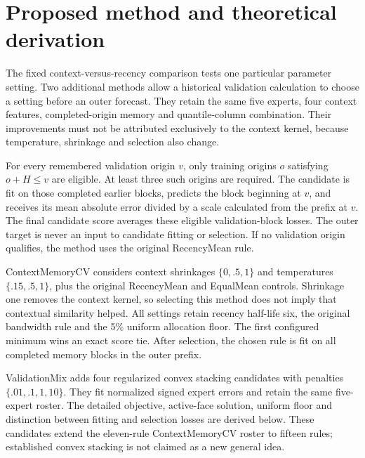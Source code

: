 \documentclass[11pt,a4paper]{article}
\begin{document}
\section{Proposed method and theoretical derivation}
\label{sec:selection-derivation}
The fixed context-versus-recency comparison tests one particular parameter setting. Two additional methods allow a historical validation calculation to choose a setting before an outer forecast. They retain the same five experts, four context features, completed-origin memory and quantile-column combination. Their improvements must not be attributed exclusively to the context kernel, because temperature, shrinkage and selection also change.

For every remembered validation origin $v$, only training origins $o$ satisfying $o+H\le v$ are eligible. At least three such origins are required. The candidate is fit on those completed earlier blocks, predicts the block beginning at $v$, and receives its mean absolute error divided by a scale calculated from the prefix at $v$. The final candidate score averages these eligible validation-block losses. The outer target is never an input to candidate fitting or selection. If no validation origin qualifies, the method uses the original RecencyMean rule.

ContextMemoryCV considers context shrinkages $\{0,.5,1\}$ and temperatures $\{.15,.5,1\}$, plus the original RecencyMean and EqualMean controls. Shrinkage one removes the context kernel, so selecting this method does not imply that contextual similarity helped. All settings retain recency half-life six, the original bandwidth rule and the 5\% uniform allocation floor. The first configured minimum wins an exact score tie. After selection, the chosen rule is fit on all completed memory blocks in the outer prefix.

ValidationMix adds four regularized convex stacking candidates with penalties $\{.01,.1,1,10\}$. They fit normalized signed expert errors and retain the same five-expert roster. The detailed objective, active-face solution, uniform floor and distinction between fitting and selection losses are derived below. These candidates extend the eleven-rule ContextMemoryCV roster to fifteen rules; established convex stacking is not claimed as a new general idea.




\end{document}
